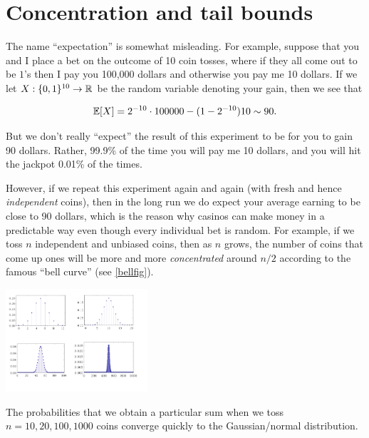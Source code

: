 
\section{Concentration and tail
bounds}\label{Concentration-and-tail-bounds}

The name ``expectation'' is somewhat misleading. For example, suppose
that you and I place a bet on the outcome of 10 coin tosses, where if
they all come out to be \(1\)'s then I pay you 100,000 dollars and
otherwise you pay me 10 dollars. If we let
\(X:\{0,1\}^{10} \rightarrow {\mathbb{R}}\) be the random variable denoting your
gain, then we see that

\[
\operatorname*{\mathbb E}[X] = 2^{-10}\cdot 100000 - (1-2^{-10})10 \sim 90 .
\]

But we don't really ``expect'' the result of this experiment to be for
you to gain 90 dollars. Rather, 99.9\% of the time you will pay me 10
dollars, and you will hit the jackpot 0.01\% of the times.

However, if we repeat this experiment again and again (with fresh and
hence \emph{independent} coins), then in the long run we do expect your
average earning to be close to 90 dollars, which is the reason why
casinos can make money in a predictable way even though every individual
bet is random. For example, if we toss \(n\) independent and unbiased
coins, then as \(n\) grows, the number of coins that come up ones will
be more and more \emph{concentrated} around \(n/2\) according to the
famous ``bell curve'' (see \cref{bellfig}).


\begin{marginfigure}
\centering
\includegraphics[width=\linewidth, height=1.5in, keepaspectratio]{../figure/binomial.png}
\caption{The probabilities that we obtain a particular sum when we toss
\(n=10,20,100,1000\) coins converge quickly to the Gaussian/normal
distribution.}
\label{bellfig}
\end{marginfigure}


